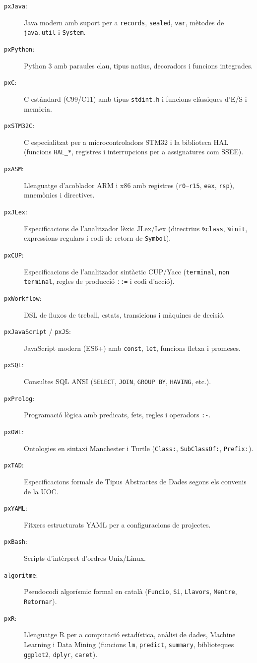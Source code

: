 \documentclass[11pt,a4paper]{article}
\begin{document}
\begin{description}
  \item[\texttt{pxJava}:] Java modern amb suport per a \texttt{records}, \texttt{sealed}, \texttt{var}, m\`etodes de \texttt{java.util} i \texttt{System}.
  \item[\texttt{pxPython}:] Python 3 amb paraules clau, tipus natius, decoradors i funcions integrades.
  \item[\texttt{pxC}:] C est\`andard (C99/C11) amb tipus \texttt{stdint.h} i funcions cl\`assiques d'E/S i mem\`oria.
  \item[\texttt{pxSTM32C}:] C especialitzat per a microcontroladors STM32 i la biblioteca HAL (funcions \texttt{HAL\_*}, registres i interrupcions per a assignatures com SSEE).
  \item[\texttt{pxASM}:] Llenguatge d'acoblador ARM i x86 amb registres (\texttt{r0}--\texttt{r15}, \texttt{eax}, \texttt{rsp}), mnem\`onics i directives.
  \item[\texttt{pxJLex}:] Especificacions de l'analitzador l\`exic JLex/Lex (directrius \texttt{\%class}, \texttt{\%init}, expressions regulars i codi de retorn de \texttt{Symbol}).
  \item[\texttt{pxCUP}:] Especificacions de l'analitzador sint\`actic CUP/Yacc (\texttt{terminal}, \texttt{non terminal}, regles de producci\'o \texttt{::=} i codi d'acci\'o).
  \item[\texttt{pxWorkflow}:] DSL de fluxos de treball, estats, transicions i m\`aquines de decisi\'o.
  \item[\texttt{pxJavaScript} / \texttt{pxJS}:] JavaScript modern (ES6+) amb \texttt{const}, \texttt{let}, funcions fletxa i promeses.
  \item[\texttt{pxSQL}:] Consultes SQL ANSI (\texttt{SELECT}, \texttt{JOIN}, \texttt{GROUP BY}, \texttt{HAVING}, etc.).
  \item[\texttt{pxProlog}:] Programaci\'o l\`ogica amb predicats, fets, regles i operadors \texttt{:-}.
  \item[\texttt{pxOWL}:] Ontologies en sintaxi Manchester i Turtle (\texttt{Class:}, \texttt{SubClassOf:}, \texttt{Prefix:}).
  \item[\texttt{pxTAD}:] Especificacions formals de Tipus Abstractes de Dades segons els convenis de la UOC.
  \item[\texttt{pxYAML}:] Fitxers estructurats YAML per a configuracions de projectes.
  \item[\texttt{pxBash}:] Scripts d'int\`erpret d'ordres Unix/Linux.
  \item[\texttt{algoritme}:] Pseudocodi algor\'ismic formal en catal\`a (\texttt{Funcio}, \texttt{Si}, \texttt{Llavors}, \texttt{Mentre}, \texttt{Retornar}).
  \item[\texttt{pxR}:] Llenguatge R per a computaci\'o estad\'istica, an\`alisi de dades, Machine Learning i Data Mining (funcions \texttt{lm}, \texttt{predict}, \texttt{summary}, biblioteques \texttt{ggplot2}, \texttt{dplyr}, \texttt{caret}).
\end{description}
\end{document}
